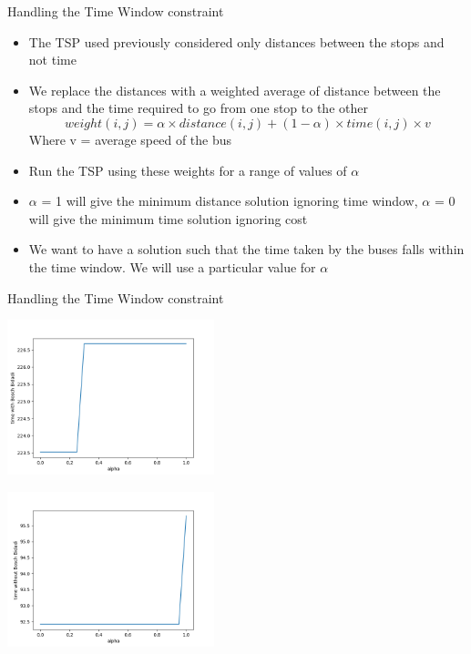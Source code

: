 \documentclass{beamer}
\begin{document}
\begin{frame}{Handling the Time Window constraint}
\begin{itemize}[<+- | alert@+>]
\item The TSP used previously considered only distances between the stops and not time
\item We replace the distances with a weighted average of distance between the stops and the time required to go from one stop to the other
\[ weight(i,j) = \alpha \times distance(i,j) + (1-\alpha) \times time(i,j) \times v\]
Where v = average speed of the bus
\item Run the TSP using these weights for a range of values of $\alpha$
\item $\alpha$ = 1 will give the minimum distance solution ignoring time window, $\alpha$ = 0 will give the minimum time solution ignoring cost
\item We want to have a solution such that the time taken by the buses falls within the time window. We will use a particular value for $\alpha$
\end{itemize}
\end{frame}
\begin{frame}{Handling the Time Window constraint}
\begin{center}
\includegraphics[width=0.45\textwidth]{time_w_bid.png}

\includegraphics[width=0.45\textwidth]{time_wo_bid.png}
\end{center}

\end{frame}
\end{document}
